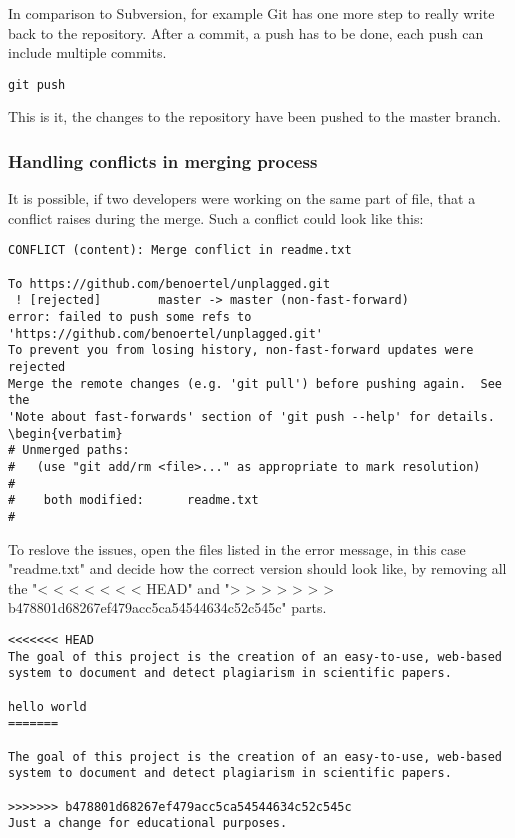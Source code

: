 In comparison to Subversion, for example Git has one more step to really write back to the repository. After a commit, 
a push has to be done, each push can include multiple commits.

\begin{lstlisting}[caption=Creating branches]
git push
\end{lstlisting}

This is it, the changes to the repository have been pushed to the master branch.

\subsubsection{Handling conflicts in merging process}
It is possible, if two developers were working on the same part of  file, that a conflict raises during the merge. Such 
a conflict could look like this:

\begin{verbatim}
CONFLICT (content): Merge conflict in readme.txt

To https://github.com/benoertel/unplagged.git
 ! [rejected]        master -> master (non-fast-forward)
error: failed to push some refs to 'https://github.com/benoertel/unplagged.git'
To prevent you from losing history, non-fast-forward updates were rejected
Merge the remote changes (e.g. 'git pull') before pushing again.  See the
'Note about fast-forwards' section of 'git push --help' for details.
\begin{verbatim}
# Unmerged paths:
#   (use "git add/rm <file>..." as appropriate to mark resolution)
#
#    both modified:      readme.txt
#
\end{verbatim}
To reslove the issues, open the files listed in the error message, in this case "readme.txt" and decide how the correct version should look like, by removing all the "< < < < < < <  HEAD" and "> > > > > > > b478801d68267ef479acc5ca54544634c52c545c" parts.

\begin{verbatim}
<<<<<<< HEAD
The goal of this project is the creation of an easy-to-use, web-based
system to document and detect plagiarism in scientific papers.

hello world
=======

The goal of this project is the creation of an easy-to-use, web-based
system to document and detect plagiarism in scientific papers.

>>>>>>> b478801d68267ef479acc5ca54544634c52c545c
Just a change for educational purposes.
\end{verbatim}

